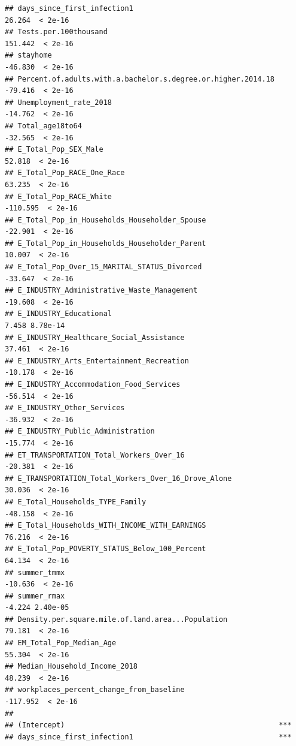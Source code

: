 \documentclass[
]{article}
\begin{document}
\begin{verbatim}
## days_since_first_infection1                                    26.264  < 2e-16
## Tests.per.100thousand                                         151.442  < 2e-16
## stayhome                                                      -46.830  < 2e-16
## Percent.of.adults.with.a.bachelor.s.degree.or.higher.2014.18  -79.416  < 2e-16
## Unemployment_rate_2018                                        -14.762  < 2e-16
## Total_age18to64                                               -32.565  < 2e-16
## E_Total_Pop_SEX_Male                                           52.818  < 2e-16
## E_Total_Pop_RACE_One_Race                                      63.235  < 2e-16
## E_Total_Pop_RACE_White                                       -110.595  < 2e-16
## E_Total_Pop_in_Households_Householder_Spouse                  -22.901  < 2e-16
## E_Total_Pop_in_Households_Householder_Parent                   10.007  < 2e-16
## E_Total_Pop_Over_15_MARITAL_STATUS_Divorced                   -33.647  < 2e-16
## E_INDUSTRY_Administrative_Waste_Management                    -19.608  < 2e-16
## E_INDUSTRY_Educational                                          7.458 8.78e-14
## E_INDUSTRY_Healthcare_Social_Assistance                        37.461  < 2e-16
## E_INDUSTRY_Arts_Entertainment_Recreation                      -10.178  < 2e-16
## E_INDUSTRY_Accommodation_Food_Services                        -56.514  < 2e-16
## E_INDUSTRY_Other_Services                                     -36.932  < 2e-16
## E_INDUSTRY_Public_Administration                              -15.774  < 2e-16
## ET_TRANSPORTATION_Total_Workers_Over_16                       -20.381  < 2e-16
## E_TRANSPORTATION_Total_Workers_Over_16_Drove_Alone             30.036  < 2e-16
## E_Total_Households_TYPE_Family                                -48.158  < 2e-16
## E_Total_Households_WITH_INCOME_WITH_EARNINGS                   76.216  < 2e-16
## E_Total_Pop_POVERTY_STATUS_Below_100_Percent                   64.134  < 2e-16
## summer_tmmx                                                   -10.636  < 2e-16
## summer_rmax                                                    -4.224 2.40e-05
## Density.per.square.mile.of.land.area...Population              79.181  < 2e-16
## EM_Total_Pop_Median_Age                                        55.304  < 2e-16
## Median_Household_Income_2018                                   48.239  < 2e-16
## workplaces_percent_change_from_baseline                      -117.952  < 2e-16
##                                                                 
## (Intercept)                                                  ***
## days_since_first_infection1                                  ***

\end{verbatim}
\end{document}
